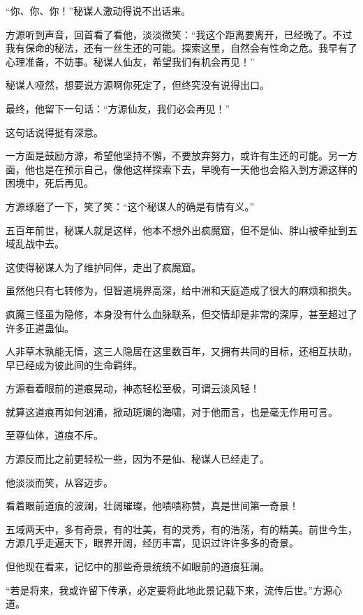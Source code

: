 \begin{this_body}
“你、你、你！”秘谋人激动得说不出话来。

方源听到声音，回首看了看他，淡淡微笑：“我这个距离要离开，已经晚了。不过我有保命的秘法，还有一丝生还的可能。探索这里，自然会有性命之危。我早有了心理准备，不妨事。秘谋人仙友，希望我们有机会再见！”

秘谋人哑然，想要说方源啊你死定了，但终究没有说得出口。

最终，他留下一句话：“方源仙友，我们必会再见！”

这句话说得挺有深意。

一方面是鼓励方源，希望他坚持不懈，不要放弃努力，或许有生还的可能。另一方面，他也是在预示自己，像他这样探索下去，早晚有一天他也会陷入到方源这样的困境中，死后再见。

方源琢磨了一下，笑了笑：“这个秘谋人的确是有情有义。”

五百年前世，秘谋人就是这样，他本不想外出疯魔窟，但不是仙、胖山被牵扯到五域乱战中去。

这使得秘谋人为了维护同伴，走出了疯魔窟。

虽然他只有七转修为，但智道境界高深，给中洲和天庭造成了很大的麻烦和损失。

疯魔三怪虽为隐修，本身没有什么血脉联系，但交情却是非常的深厚，甚至超过了许多正道蛊仙。

人非草木孰能无情，这三人隐居在这里数百年，又拥有共同的目标，还相互扶助，早已经成为彼此间的生命羁绊。

方源看着眼前的道痕晃动，神态轻松至极，可谓云淡风轻！

就算这道痕再如何汹涌，掀动斑斓的海啸，对于他而言，也是毫无作用可言。

至尊仙体，道痕不斥。

方源反而比之前更轻松一些，因为不是仙、秘谋人已经走了。

他淡淡而笑，从容迈步。

看着眼前道痕的波澜，壮阔璀璨，他啧啧称赞，真是世间第一奇景！

五域两天中，多有奇景，有的壮美，有的灵秀，有的浩荡，有的精美。前世今生，方源几乎走遍天下，眼界开阔，经历丰富，见识过许许多多的奇景。

但他现在看来，记忆中的那些奇景统统不如眼前的道痕狂澜。

“若是将来，我或许留下传承，必定要将此地此景记载下来，流传后世。”方源心道。

\end{this_body}

